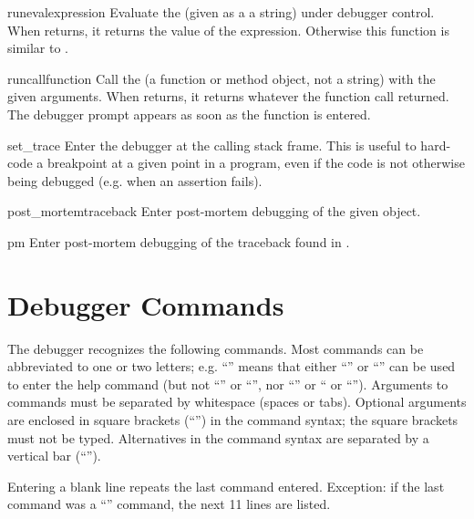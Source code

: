 \begin{funcdesc}{runeval}{expression}
Evaluate the  (given as a a string) under debugger
control.  When  returns, it returns the value of the
expression.  Otherwise this function is similar to
.
\end{funcdesc}

\begin{funcdesc}{runcall}{function}
Call the  (a function or method object, not a string)
with the given arguments.  When  returns, it returns
whatever the function call returned.  The debugger prompt appears as
soon as the function is entered.
\end{funcdesc}

\begin{funcdesc}{set_trace}{}
Enter the debugger at the calling stack frame.  This is useful to
hard-code a breakpoint at a given point in a program, even if the code
is not otherwise being debugged (e.g. when an assertion fails).
\end{funcdesc}

\begin{funcdesc}{post_mortem}{traceback}
Enter post-mortem debugging of the given  object.
\end{funcdesc}

\begin{funcdesc}{pm}{}
Enter post-mortem debugging of the traceback found in
.
\end{funcdesc}

\section{Debugger Commands}

The debugger recognizes the following commands.  Most commands can be
abbreviated to one or two letters; e.g. ``'' means that
either ``'' or ``'' can be used to enter the help
command (but not ``'' or ``'', nor ``'' or
`` or ``'').  Arguments to commands must be
separated by whitespace (spaces or tabs).  Optional arguments are
enclosed in square brackets (``\code{[]}'') in the command syntax; the
square brackets must not be typed.  Alternatives in the command syntax
are separated by a vertical bar (``\code{|}'').

Entering a blank line repeats the last command entered.  Exception: if
the last command was a ``'' command, the next 11 lines are
listed.

